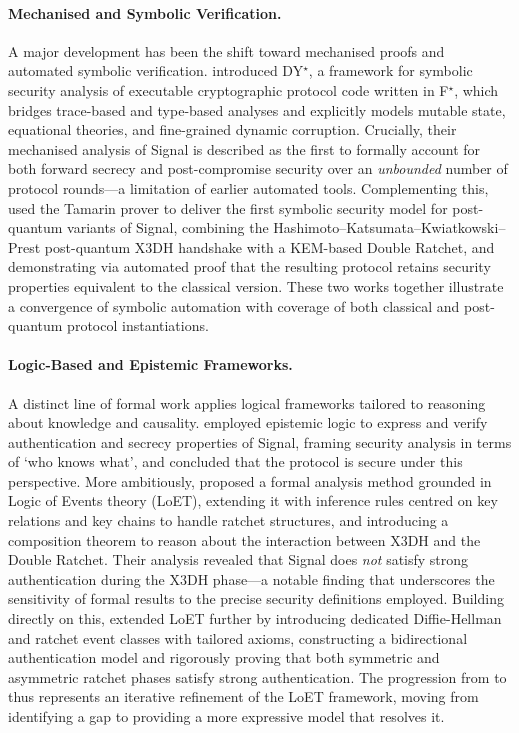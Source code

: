 \paragraph{Mechanised and Symbolic Verification.}
A major development has been the shift toward mechanised proofs and automated symbolic verification. \textcite{bhargavan2021} introduced DY$^\star$, a framework for symbolic security analysis of executable cryptographic protocol code written in F$^\star$, which bridges trace-based and type-based analyses and explicitly models mutable state, equational theories, and fine-grained dynamic corruption. Crucially, their mechanised analysis of Signal is described as the first to formally account for both forward secrecy and post-compromise security over an \emph{unbounded} number of protocol rounds—a limitation of earlier automated tools. Complementing this, \textcite{beguinet2024} used the Tamarin prover to deliver the first symbolic security model for post-quantum variants of Signal, combining the Hashimoto–Katsumata–Kwiatkowski–Prest post-quantum X3DH handshake \parencite{hashimoto2021} with a KEM-based Double Ratchet, and demonstrating via automated proof that the resulting protocol retains security properties equivalent to the classical version. These two works together illustrate a convergence of symbolic automation with coverage of both classical and post-quantum protocol instantiations.

\paragraph{Logic-Based and Epistemic Frameworks.}
A distinct line of formal work applies logical frameworks tailored to reasoning about knowledge and causality. \textcite{kamkuemah2021} employed epistemic logic to express and verify authentication and secrecy properties of Signal, framing security analysis in terms of `who knows what', and concluded that the protocol is secure under this perspective. More ambitiously, \textcite{li2024} proposed a formal analysis method grounded in Logic of Events theory (LoET), extending it with inference rules centred on key relations and key chains to handle ratchet structures, and introducing a composition theorem to reason about the interaction between X3DH and the Double Ratchet. Their analysis revealed that Signal does \emph{not} satisfy strong authentication during the X3DH phase—a notable finding that underscores the sensitivity of formal results to the precise security definitions employed. Building directly on this, \textcite{xiao2025} extended LoET further by introducing dedicated Diffie-Hellman and ratchet event classes with tailored axioms, constructing a bidirectional authentication model and rigorously proving that both symmetric and asymmetric ratchet phases satisfy strong authentication. The progression from \textcite{li2024} to \textcite{xiao2025} thus represents an iterative refinement of the LoET framework, moving from identifying a gap to providing a more expressive model that resolves it.

